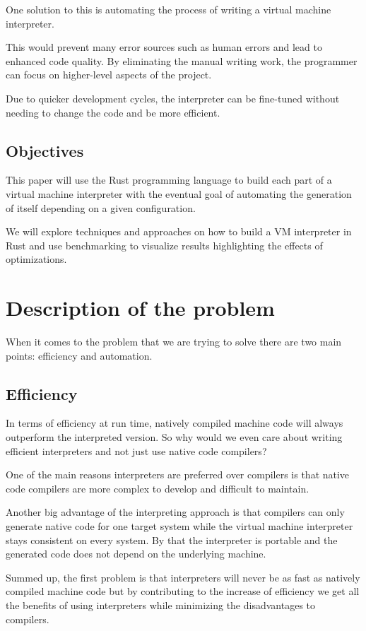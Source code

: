 \documentclass{article}
\begin{document}
One solution to this is automating the process of writing a virtual machine
interpreter.

This would prevent many error sources such as human errors and lead to enhanced
code quality. By eliminating the manual writing work, the programmer can focus
on higher-level aspects of the project.

Due to quicker development cycles, the interpreter can be fine-tuned without
needing to change the code and be more efficient.

\subsection{Objectives}
This paper will use the Rust programming language to build each part of a virtual machine 
interpreter with the eventual goal of automating the generation of itself depending on
a given configuration.

We will explore techniques and approaches on how to build a VM interpreter in
Rust and use benchmarking to visualize results highlighting the effects of
optimizations.

\section{Description of the problem}
When it comes to the problem that we are trying to solve there are two main
points: efficiency and automation.

\subsection{Efficiency}
In terms of efficiency at run time, natively compiled machine code will always
outperform the interpreted version. So why would we even care about writing
efficient interpreters and not just use native code compilers?

One of the main reasons interpreters are preferred over compilers is that 
native code compilers are more complex to develop and difficult to maintain.
~\cite{structure_and_performance}

Another big advantage of the interpreting approach is that compilers can only
generate native code for one target system while the virtual machine
interpreter stays consistent on every system. By that the interpreter is
portable and the generated code does not depend on the underlying machine.

Summed up, the first problem is that interpreters will never be as fast as
natively compiled machine code but by contributing to the increase of efficiency
we get all the benefits of using interpreters while minimizing the
disadvantages to compilers.
\end{document}

